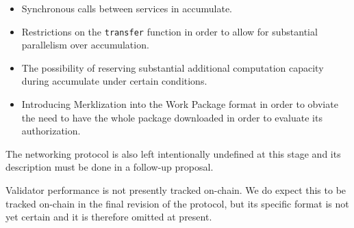 \begin{itemize}
  \item Synchronous calls between services in accumulate.
  \item Restrictions on the \texttt{transfer} function in order to allow for substantial parallelism over accumulation.
  \item The possibility of reserving substantial additional computation capacity during accumulate under certain conditions.
  \item Introducing Merklization into the Work Package format in order to obviate the need to have the whole package downloaded in order to evaluate its authorization.
\end{itemize}

The networking protocol is also left intentionally undefined at this stage and its description must be done in a follow-up proposal.

Validator performance is not presently tracked on-chain. We do expect this to be tracked on-chain in the final revision of the \Jam protocol, but its specific format is not yet certain and it is therefore omitted at present.
